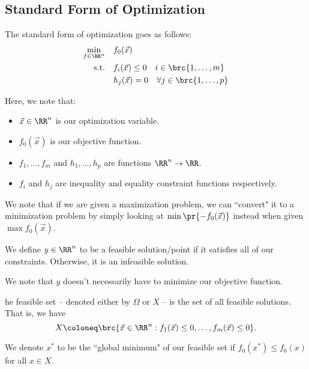 \documentclass[openany]{book}
\begin{document}
\subsection{Standard Form of Optimization}

\begin{defn}
	The standard form of optimization goes as follows:
	\begin{align*}
		\min_{f \in \RR^{n}} &\quad f_0(\vec{x}) \\
		\mathrm{s.t.} &\quad f_i(\vec x) \leq 0 \quad i \in \brc{1, \ldots, m} \\
		&\quad h_j(\vec x) = 0 \quad \forall j \in \brc{1, \ldots, p} 
	\end{align*}

	Here, we note that:
	\begin{itemize}
		\item $\vec x \in \RR^{n}$ is our optimization variable.
		\item $f_0(\vec x)$ is our objective function.
		\item $f_1, \ldots, f_m$ and $h_1, \ldots, h_p$ are functions $\RR^{n} \rightarrow \RR$.
		\item $f_i$ and $h_j$ are inequality and equality constraint functions respectively.
	\end{itemize}
\end{defn}

We note that if we are given a maximization problem, we can ``convert" it to a minimization problem by simply looking at $\min \pr{-f_0(\vec x)}$ instead when given $\max f_0(\vec x)$.

\begin{defn}
	We define $y \in \RR^{n}$ to be a feasible solution/point if it satisfies all of our constraints. Otherwise, it is an infeasible solution.
	
	We note that $y$ doesn't necessarily have to minimize our objective function.
\end{defn}

\begin{defn}
	he feasible set -- denoted either by $\Omega$  or $X$ -- is the set of all feasible solutions. That is, we have
	\begin{equation*}
		X \coloneq \brc{\vec x \in \RR^{n} : f_1(\vec x) \leq 0, \ldots, f_m(\vec x) \leq 0}.
	\end{equation*}
\end{defn}

\begin{defn}
	We denote $x^{*}$ to be the ``global minimum" of our feasible set if $f_0(x^{*}) \leq f_0(x)$ for all $x \in X$.
\end{defn}
\end{document}
